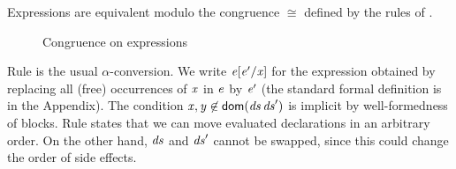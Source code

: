 Expressions are equivalent modulo the congruence $\cong$ defined by the rules of . 
\begin{center}
\begin{figure}[ht]
\caption{Congruence on expressions}
\label{fig:congruence}
\end{figure}
\end{center}
Rule  is the usual $\alpha$-conversion. We write $\mathit{e}[\mathit{e}'/\mathit{x}]$
for the expression obtained by replacing all (free)
occurrences of $\mathit{x}$ in $\mathit{e}$ by $\mathit{e}'$ {(the standard formal definition is in the Appendix)}. The condition $\mathit{x},\mathit{y}\not\in\textsf{dom}(\mathit{ds}\,\mathit{ds}')$ is implicit by well-formedness of blocks. Rule  states that we can move evaluated declarations in an arbitrary order.  
On the other hand, $\mathit{ds}$ and $\mathit{ds}'$ cannot be swapped, since this could change 
the order of side effects. 

